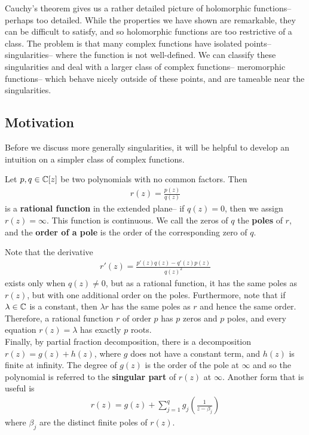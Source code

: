 \documentclass{memoir}
\begin{document}


Cauchy's theorem gives us a rather detailed picture of holomorphic functions-- perhaps too detailed. While the properties we have shown are remarkable, they can be difficult to satisfy, and so holomorphic functions are too restrictive of a class. The problem is that many complex functions have isolated points-- singularities-- where the function is not well-defined. We can classify these singularities and deal with a larger class of complex functions-- meromorphic functions-- which behave nicely outside of these points, and are tameable near the singularities.

\subsection{Motivation}
\label{sub:motivation}

Before we discuss more generally singularities, it will be helpful to develop an intuition on a simpler class of complex functions.

\begin{defn}
	Let \(p,q \in \mathbb{C}[z]\) be two polynomials with no common factors. Then
	\begin{align*}
		r(z) = \frac{p(z)}{q(z)}
	\end{align*}
	is a \textbf{rational function} in the extended plane-- if \(q(z) = 0\), then we assign \(r(z) = \infty\). This function is continuous. We call the zeros of \(q\) the \textbf{poles} of \(r\), and the \textbf{order of a pole} is the order of the corresponding zero of \(q\).
\end{defn}
Note that the derivative
\begin{align*}
	r'(z) = \frac{p'(z)q(z) - q'(z)p(z)}{q(z)^2}
\end{align*}
exists only when \(q(z) \neq 0\), but as a rational function, it has the same poles as \(r(z)\), but with one additional order on the poles. Furthermore, note that if \(\lambda \in \mathbb{C}\) is a constant, then \(\lambda r\) has the same poles as \(r\) and hence the same order. Therefore, a rational function \(r\) of order \(p\) has \(p\) zeros and \(p\) poles, and every equation \(r(z) = \lambda \) has exactly \(p\) roots.\\

Finally, by partial fraction decomposition, there is a decomposition \(r(z) = g(z) + h(z)\), where \(g\) does not have a constant term, and \(h(z)\) is finite at infinity. The degree of \(g(z)\) is the order of the pole at \(\infty\) and so the polynomial is referred to the \textbf{singular part} of \(r(z)\) at \(\infty\). Another form that is useful is
\begin{align*}
	r(z) = g(z) + \sum_{j=1}^{q} g_j \left( \frac{1}{z-\beta_j} \right) 
\end{align*}
where \(\beta_j\) are the distinct finite poles of \(r(z)\).\\
\end{document}

